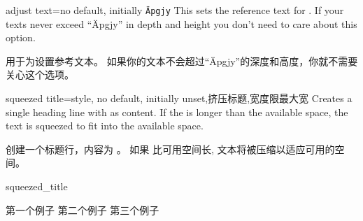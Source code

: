 



\begin{docTcbKey}{adjust text}{=}{no default, initially \texttt{\"Apgjy}}
This sets the reference text for . If your texts
never exceed \enquote{\"Apgjy} in depth and height you don't need to care about this option.

用于为设置参考文本。%
如果你的文本不会超过\enquote{\"Apgjy}的深度和高度，你就不需要关心这个选项。





\end{docTcbKey}

\begin{docTcbKey}[][doc new=2014-11-24]{squeezed title}{=}{style, no default, initially unset,挤压标题,宽度限最大宽}
Creates a single heading line with  as content.
If the  is longer than the available space, the text is
squeezed to fit into the available space.

创建一个标题行，内容为 。%
如果  比可用空间长, 文本将被压缩以适应可用的空间。
\begin{exdispExample}{squeezed_title}
\begin{tcbitemize}[
raster columns=3,%
raster equal height,%
colframe=red!75!black,colback=red!5!white,%
fonttitle=\bfseries%
]
\tcbitem[squeezed title={短标题}]
第一个例子
\tcbitem[squeezed title={这是一个非常非常长的标题}]
第二个例子
\tcbitem[squeezed title={这个标题显然对这个例子来说太长了}]
第三个例子
\end{tcbitemize}
\end{exdispExample}
\end{docTcbKey}



